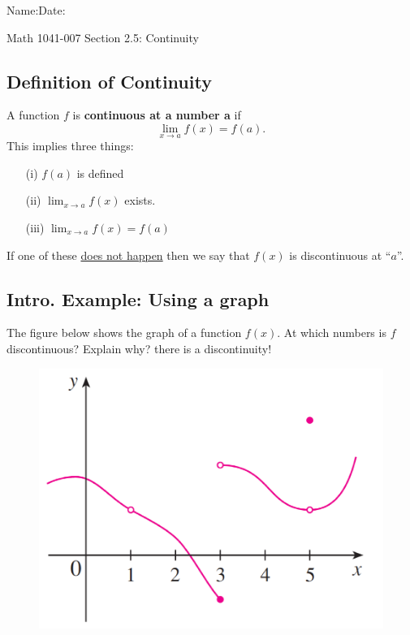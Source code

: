 \documentclass[10pt]{book}
\theoremstyle{definition}
\begin{document}
\begin{flushleft}
Name:\underline{\hspace{13cm}}Date:\underline{\hspace{2cm}}
\end{flushleft}
\begin{center}
{\Large Math 1041-007 \hspace{0.5cm} Section 2.5: Continuity}
\end{center}

\begin{tcolorbox}
\subsection*{Definition of Continuity}
A function $f$ is \textbf{continuous at a number a} if 
\[
\lim_{x\rightarrow a}f(x)=f(a).
\]
This implies three things:
\begin{itemize}
    \item[(i)] $f(a)$ is defined
    \item[(ii)] $\displaystyle\lim_{x\rightarrow a}f(x)$ exists.
    \item[(iii)]$\displaystyle\lim_{x\rightarrow a}f(x)=f(a)$
\end{itemize}
If one of these \underline{does not happen} then we say that $f(x)$ is discontinuous at ``$a$''.
\end{tcolorbox}
\subsection*{Intro. Example: Using a graph}
The figure below shows the graph of a function $f(x)$. At which numbers is $f$ discontinuous? Explain why? there is a discontinuity!
\begin{figure}[h!]
    \centering
    \includegraphics[scale=0.5]{fig1.png}
\end{figure}
\clearpage
\end{document}
